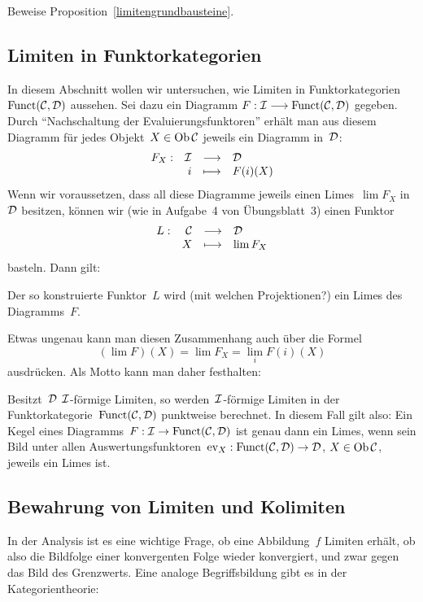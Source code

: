 \begin{aufg}Beweise Proposition~\ref{limitengrundbausteine}.\end{aufg}


\subsection{Limiten in Funktorkategorien}

In diesem Abschnitt wollen wir untersuchen, wie Limiten in
Funktorkategorien~$\mathrm{Funct}(\mathcal{C},\mathcal{D})$ aussehen. Sei dazu ein Diagramm
$F : \mathcal{I} \longrightarrow \mathrm{Funct}(\mathcal{C},\mathcal{D})$
gegeben. Durch "`Nachschaltung der Evaluierungsfunktoren"' erhält man aus
diesem Diagramm für jedes Objekt~$X \in \operatorname{Ob}\mathcal{C}$ jeweils ein Diagramm in~$\mathcal{D}$:
\[ \begin{array}{@{}rrcl@{}}
  F_X : & \I &\longrightarrow& \D \\
  & i &\longmapsto& F(i)(X)
\end{array} \]
Wenn wir voraussetzen, dass all diese Diagramme jeweils einen Limes~$\lim F_X$ in~$\mathcal{D}$
besitzen, können wir (wie in Aufgabe~4 von Übungsblatt~3) einen Funktor
\[ \begin{array}{@{}rrcl@{}}
  L : & \C &\longrightarrow& \D \\
  & X &\longmapsto& \lim F_X
\end{array} \]
basteln. Dann gilt:
\begin{prop}
Der so konstruierte Funktor~$L$ wird (mit welchen Projektionen?) ein Limes des Diagramms~$F$.
\end{prop}
Etwas ungenau kann man diesen Zusammenhang auch über die Formel
\[ (\lim F)(X) = \lim F_X = \lim_i F(i)(X) \]
ausdrücken. Als Motto kann man daher festhalten:
\begin{motto}Besitzt~$\mathcal{D}$ $\mathcal{I}$-förmige Limiten, so werden~$\mathcal{I}$-förmige Limiten
in der Funktorkategorie~$\mathrm{Funct}(\mathcal{C},\mathcal{D})$ punktweise berechnet. In diesem Fall
gilt also:
Ein Kegel eines Diagramms~$F : \mathcal{I} \to \mathrm{Funct}(\mathcal{C},\mathcal{D})$ ist genau dann ein Limes,
wenn sein Bild unter allen Auswertungsfunktoren~$\mathrm{ev}_X : \mathrm{Funct}(\mathcal{C},\mathcal{D}) \to \mathcal{D}$,
$X \in \operatorname{Ob}\mathcal{C}$, jeweils ein Limes ist.
\end{motto}


\subsection{Bewahrung von Limiten und Kolimiten}

In der Analysis ist es eine wichtige Frage, ob eine Abbildung~$f$ Limiten
erhält, ob also die Bildfolge einer konvergenten Folge wieder konvergiert, und
zwar gegen das Bild des Grenzwerts. Eine analoge Begriffsbildung gibt es in der
Kategorientheorie:

